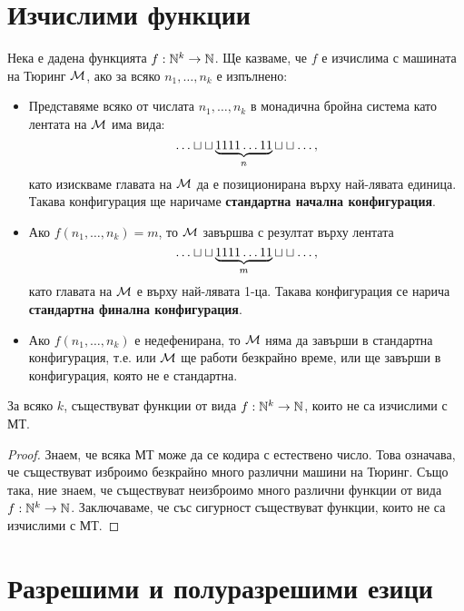 \section{Изчислими функции}

Нека е дадена функцията $f:\mathbb{N}^k \to \mathbb{N}$.
Ще казваме, че $f$ е изчислима с машината на Тюринг $\mathcal{M}$,
ако за всяко $n_1,\dots,n_k$ е изпълнено:
\begin{itemize}
\item 
  Представяме всяко от числата $n_1,\dots,n_k$ в монадична бройна система
  като лентата на $\mathcal{M}$ има вида:  
  \[\dots \blank \blank \underbrace{1111\dots 11}_{n} \blank\blank\dots,\]
  като изискваме главата на $\mathcal{M}$ да е позиционирана върху най-лявата единица.
  Такава конфигурация ще наричаме {\bf стандартна начална конфигурация}.
\item
  Ако $f(n_1,\dots,n_k) = m$, то $\mathcal{M}$ завършва с резултат върху лентата
  \[\dots \blank \blank \underbrace{1111\dots 11}_{m} \blank\blank\dots,\]
  като главата на $\mathcal{M}$ е върху най-лявата 1-ца.
  Такава конфигурация се нарича {\bf стандартна финална конфигурация}.
\item
  Ако $f(n_1,\dots,n_k)$ е недефенирана, то $\mathcal{M}$ няма да завърши в стандартна конфигурация, т.е.
  или $\mathcal{M}$ ще работи безкрайно време, или ще завърши в конфигурация, която не е стандартна.
\end{itemize}


\begin{thm}
  За всяко $k$, съществуват функции от вида $f:\mathbb{N}^k\to\mathbb{N}$, които не са изчислими с МТ.
\end{thm}
\begin{proof}
  Знаем, че всяка МТ може да се кодира с естествено число.
  Това означава, че съществуват изброимо безкрайно много различни машини на Тюринг.
  Също така, ние знаем, че съществуват неизброимо много различни функции от вида $f:\mathbb{N}^k\to\mathbb{N}$.
  Заключаваме, че със сигурност съществуват функции, които не са изчислими с МТ.
\end{proof}



\section{Разрешими и полуразрешими езици}


